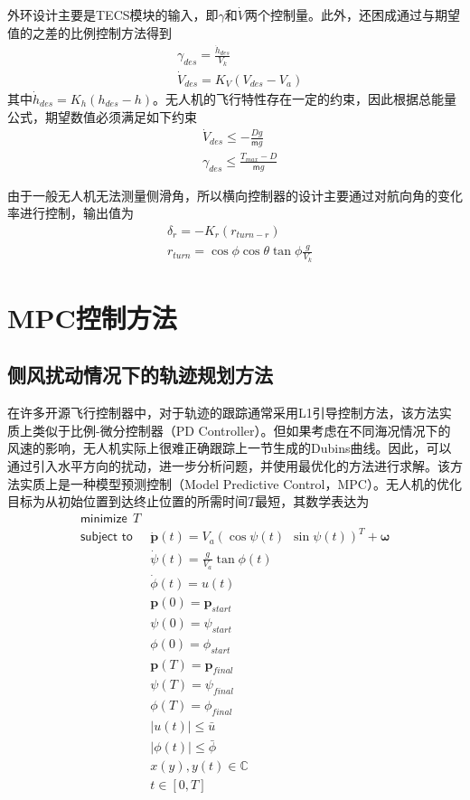 外环设计主要是TECS模块的输入，即$\gamma$和$\dot{V}$两个控制量。此外，还困成通过与期望值的之差的比例控制方法得到
\begin{align}
&\gamma_{des} = \frac{\dot{h}_{des}}{V_k} \\
&\dot{V}_{des} = K_V(V_{des}-V_a) 
\end{align}
其中$\dot{h}_{des} = K_h(h_{des}-h)$。无人机的飞行特性存在一定的约束，因此根据总能量公式，期望数值必须满足如下约束
\begin{align}
&\dot{V} _{des} \le -\frac{Dg}{\mathsf{m}g} \\
&\gamma_{des} \le \frac{T_{max} - D}{\mathsf{m}g}
\end{align}

由于一般无人机无法测量侧滑角，所以横向控制器的设计主要通过对航向角的变化率进行控制，输出值为
\begin{align}
&\delta_r = -K_r (r_{turn - r}) \\
&r_{turn} = \cos \phi \cos \theta \tan \phi \frac{g}{V_k}
\end{align}

\section{MPC控制方法}

\subsection{侧风扰动情况下的轨迹规划方法}
在许多开源飞行控制器中，对于轨迹的跟踪通常采用L1引导控制方法，该方法实质上类似于比例-微分控制器（PD Controller）。但如果考虑在不同海况情况下的风速的影响，无人机实际上很难正确跟踪上一节生成的Dubins曲线。因此，可以通过引入水平方向的扰动，进一步分析问题，并使用最优化的方法进行求解。该方法实质上是一种模型预测控制（Model Predictive Control，MPC）。无人机的优化目标为从初始位置到达终止位置的所需时间$T$最短，其数学表达为 
\begin{align}
	\textsf{minimize}\ \ T \label{eq:gust_dubins_1} \\
	\textsf{subject to}\  \ &\dot{\mathbf{p}}(t) = {V}_a(\cos \psi(t)\ \ \sin \psi(t))^T + \mathbf{\omega}  \nonumber \\
	& \dot{\psi}(t) = \frac{g}{{V}_a} \tan \phi(t) \nonumber \\
	& \dot{\phi}(t) = u(t) \nonumber \\
	& \mathbf{p}(0) = \mathbf{p}_{start} \nonumber \\
	& \psi(0) = \psi_{start} \nonumber \\
	& \phi(0) = \phi_{start} \nonumber \\
	& \mathbf{p}(T) = \mathbf{p}_{final} \nonumber \\
	& \psi(T) = \psi_{final} \nonumber \\
	& \phi(T) = \phi_{final} \nonumber \\
	& |u(t)| \le \bar{u}  \nonumber \\
	& |\phi(t)| \le \bar{\phi} \nonumber \\
	& x(y), y(t) \in \mathbb{C} \nonumber \\
	& t \in [0, T] \nonumber
\end{align}

